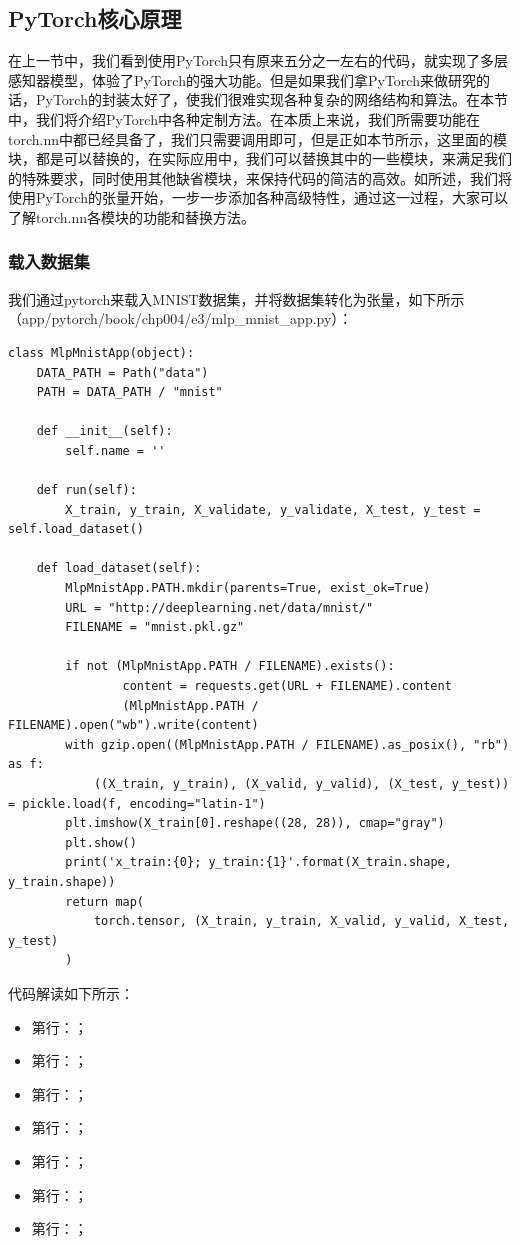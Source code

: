 \documentclass[UTF8]{article}
\begin{document}
\subsection{PyTorch核心原理}
在上一节中，我们看到使用PyTorch只有原来五分之一左右的代码，就实现了多层感知器模型，体验了PyTorch的强大功能。但是如果我们拿PyTorch来做研究的话，PyTorch的封装太好了，使我们很难实现各种复杂的网络结构和算法。在本节中，我们将介绍PyTorch中各种定制方法。在本质上来说，我们所需要功能在torch.nn中都已经具备了，我们只需要调用即可，但是正如本节所示，这里面的模块，都是可以替换的，在实际应用中，我们可以替换其中的一些模块，来满足我们的特殊要求，同时使用其他缺省模块，来保持代码的简洁的高效。如\cite{pytorch-nn-in-detail1}所述，我们将使用PyTorch的张量开始，一步一步添加各种高级特性，通过这一过程，大家可以了解torch.nn各模块的功能和替换方法。 \newline
\subsubsection{载入数据集}
我们通过pytorch来载入MNIST数据集，并将数据集转化为张量，如下所示（app/pytorch/book/chp004/e3/mlp\_mnist\_app.py）：
\begin{lstlisting}
class MlpMnistApp(object):
    DATA_PATH = Path("data")
    PATH = DATA_PATH / "mnist"

    def __init__(self):
        self.name = ''

    def run(self):
        X_train, y_train, X_validate, y_validate, X_test, y_test = self.load_dataset()

    def load_dataset(self):
        MlpMnistApp.PATH.mkdir(parents=True, exist_ok=True)
        URL = "http://deeplearning.net/data/mnist/"
        FILENAME = "mnist.pkl.gz"

        if not (MlpMnistApp.PATH / FILENAME).exists():
                content = requests.get(URL + FILENAME).content
                (MlpMnistApp.PATH / FILENAME).open("wb").write(content)
        with gzip.open((MlpMnistApp.PATH / FILENAME).as_posix(), "rb") as f:
            ((X_train, y_train), (X_valid, y_valid), (X_test, y_test)) = pickle.load(f, encoding="latin-1")
        plt.imshow(X_train[0].reshape((28, 28)), cmap="gray")
        plt.show()
        print('x_train:{0}; y_train:{1}'.format(X_train.shape, y_train.shape))
        return map(
            torch.tensor, (X_train, y_train, X_valid, y_valid, X_test, y_test)
        )
\end{lstlisting}
代码解读如下所示：
\begin{itemize}
\item 第行：；
\item 第行：；
\item 第行：；
\item 第行：；
\item 第行：；
\item 第行：；
\item 第行：；
\end{itemize}
\end{document}
